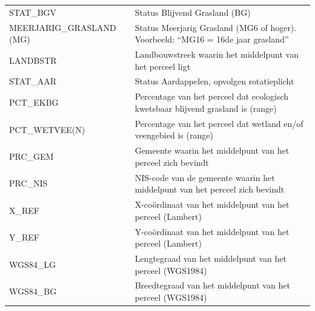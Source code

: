 {\begin{xltabular}{\textwidth}{@{} >{\raggedright\arraybackslash}l >{\raggedright\arraybackslash}X @{}}
        STAT\_BGV & Status Blijvend Grasland (BG) \\
        MEERJARIG\_GRASLAND (MG) & Status Meerjarig Grasland (MG6 of hoger). Voorbeeld: “MG16 = 16de jaar grasland” \\
        LANDBSTR & Landbouwstreek waarin het middelpunt van het perceel ligt \\
        STAT\_AAR & Status Aardappelen, opvolgen rotatieplicht \\
        PCT\_EKBG & Percentage van het perceel dat ecologisch kwetsbaar blijvend grasland is (range) \\
        PCT\_WETVEE(N) & Percentage van het perceel dat wetland en/of veengebied is (range) \\
        PRC\_GEM & Gemeente waarin het middelpunt van het perceel zich bevindt \\
        PRC\_NIS & NIS-code van de gemeente waarin het middelpunt van het perceel zich bevindt \\
        X\_REF & X-coördinaat van het middelpunt van het perceel (Lambert) \\
        Y\_REF & Y-coördinaat van het middelpunt van het perceel (Lambert) \\
        WGS84\_LG & Lengtegraad van het middelpunt van het perceel (WGS1984) \\
        WGS84\_BG & Breedtegraad van het middelpunt van het perceel (WGS1984) \\
        \bottomrule
    \end{xltabular}
}

